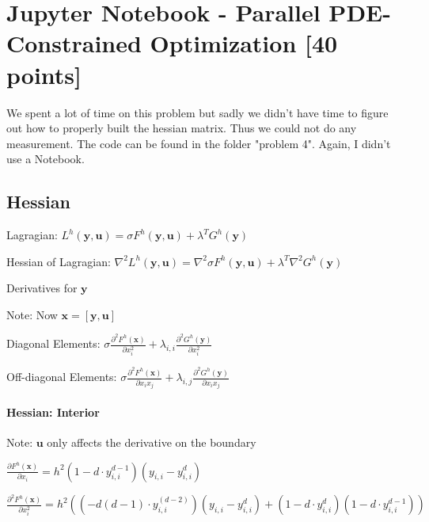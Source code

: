 \documentclass[unicode,11pt,a4paper,oneside,numbers=endperiod,openany]{scrartcl}
\begin{document}


\section{Jupyter Notebook - Parallel PDE-Constrained Optimization [40 points]}
We spent a lot of time on this problem but sadly we didn't have time to
figure out how to properly built the hessian matrix. Thus we could not do any
measurement. The code can be found in the folder "problem 4". Again, I didn't
use a Notebook.


\subsection{Hessian}
Lagragian: $L^h(\mathbf{y}, \mathbf{u}) = \sigma F^h(\mathbf{y}, \mathbf{u})
            + \lambda^T G^h(\mathbf{y})$

Hessian of Lagragian:
$\nabla^2 L^h(\mathbf{y}, \mathbf{u}) =\nabla^2 \sigma F^h(\mathbf{y}, \mathbf{u})
            + \lambda^T \nabla^2 G^h(\mathbf{y})$

Derivatives for $\mathbf{y}$

Note: Now $\mathbf{x} = [\mathbf{y},\mathbf{u}]$

Diagonal Elements:
$\sigma\frac{\partial^2 F^h(\mathbf{x})}{\partial x_{i}^2}
+ \lambda_{i,i} \frac{\partial^2 G^h(\mathbf{y})}{\partial x_{i}^2}$

Off-diagonal Elements:
$\sigma\frac{\partial^2 F^h(\mathbf{x})}{\partial x_{i}x_{j}}
+ \lambda_{i,j} \frac{\partial^2 G^h(\mathbf{y})}{\partial x_{i}x_{j}}$


\paragraph{Hessian: Interior}
Note: $\mathbf{u}$ only affects the derivative on the boundary

$\frac{\partial F^h(\mathbf{x})}{\partial x_{i}} 
 = h^2 ( 1 - d\cdot y_{i,i}^{d-1} ) (y_{i,i} - y_{i,i}^d)$

$\frac{\partial^2 F^h(\mathbf{x})}{\partial x_{i}^2}
= h^2( (-d(d-1)\cdot y_{i,i}^{(d-2)})(y_{i,i} - y_{i,i}^d) 
  + (1-d\cdot y_{i,i}^d)(1-d\cdot y_{i,i}^{d-1}) )$
\end{document}
